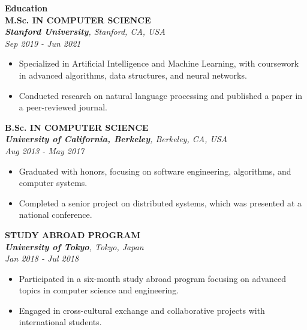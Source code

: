 \textcolor{accentcolor}{\textbf{\large {Education}}} \\[0.2cm]

\textbf{M.Sc. \MakeUppercase{in Computer Science}} \\[0.1cm]
\textit{\textbf{Stanford University}, Stanford, CA, USA} \\ \textit{Sep 2019 - Jun 2021}
\begin{itemize} [leftmargin=0.4cm]
    \item Specialized in Artificial Intelligence and Machine Learning, with coursework in advanced algorithms, data structures, and neural networks.
    \item Conducted research on natural language processing and published a paper in a peer-reviewed journal.
\end{itemize}


\vspace{0.5cm}

\textbf{B.Sc. \MakeUppercase{in Computer Science}} \\[0.1cm]
\textit{\textbf{University of California, Berkeley}, Berkeley, CA, USA} \\ \textit{Aug 2013 - May 2017}
\begin{itemize} [leftmargin=0.4cm]
    \item Graduated with honors, focusing on software engineering, algorithms, and computer systems.
    \item Completed a senior project on distributed systems, which was presented at a national conference.
\end{itemize}

\vspace{0.5cm}

\textbf{\MakeUppercase{Study Abroad Program}} \\[0.1cm]
\textit{\textbf{University of Tokyo}, Tokyo, Japan} \\ \textit{Jan 2018 - Jul 2018}
\begin{itemize} [leftmargin=0.4cm]
    \item Participated in a six-month study abroad program focusing on advanced topics in computer science and engineering.
    \item Engaged in cross-cultural exchange and collaborative projects with international students.
\end{itemize}